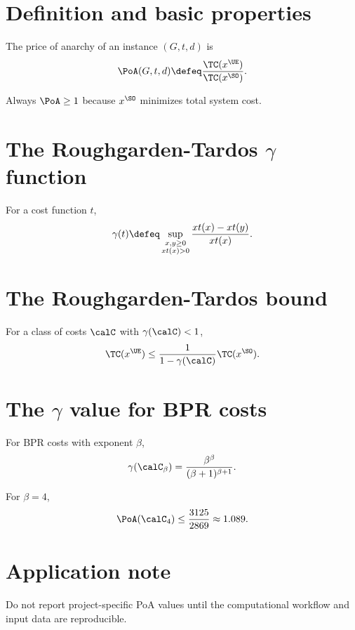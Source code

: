 
\section{Definition and basic properties}


\begin{definition}\label{def:poa}
The price of anarchy of an instance $(G,t,d)$ is
\[
\PoA(G,t,d) \defeq \frac{\TC(x^{\UE})}{\TC(x^{\SO})}.
\]
\end{definition}

\begin{remark}
Always $\PoA \geq 1$ because $x^{\SO}$ minimizes total system cost.
\end{remark}

\section{The Roughgarden-Tardos $\gamma$ function}

\begin{definition}\label{def:gamma}
For a cost function $t$,
\[
\gamma(t) \defeq
\sup_{\substack{x,y \geq 0 \\ x t(x)>0}}
\frac{x t(x)-x t(y)}{x t(x)}.
\]
\end{definition}

\section{The Roughgarden-Tardos bound}

\begin{theorem}\label{thm:roughgarden_tardos}
For a class of costs $\calC$ with $\gamma(\calC)<1$,
\[
\TC(x^{\UE}) \leq \frac{1}{1-\gamma(\calC)}\TC(x^{\SO}).
\]
\end{theorem}

\section{The $\gamma$ value for BPR costs}

\begin{theorem}[Roughgarden, 2003]\label{thm:gamma_bpr}
For BPR costs with exponent $\beta$,
\[
\gamma(\calC_\beta)=\frac{\beta^\beta}{(\beta+1)^{\beta+1}}.
\]
\end{theorem}

\begin{corollary}\label{cor:poa_bpr}
For $\beta=4$,
\[
\PoA(\calC_4) \leq \frac{3125}{2869} \approx 1.089.
\]
\end{corollary}

\section{Application note}

\begin{remark}
Do not report project-specific PoA values until the computational workflow and input data are reproducible.
\end{remark}
